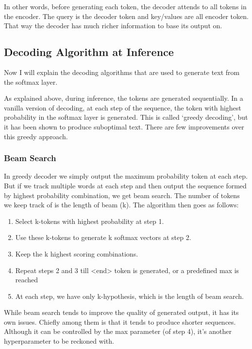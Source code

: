\documentclass[]{krantz}
\providecommand{\tightlist}{%
  \setlength{\itemsep}{0pt}\setlength{\parskip}{0pt}}
\begin{document}
In other words, before generating each token, the decoder attends to all tokens in the encoder. The query is the decoder token and key/values are all encoder token. That way the decoder has much richer information to base its output on.

\hypertarget{decoding-algorithm-at-inference}{%
\subsection{Decoding Algorithm at Inference}\label{decoding-algorithm-at-inference}}

Now I will explain the decoding algorithms that are used to generate text from the softmax layer.

As explained above, during inference, the tokens are generated sequentially. In a vanilla version of decoding, at each step of the sequence, the token with highest probability in the softmax layer is generated. This is called `greedy decoding', but it has been shown to produce suboptimal text. There are few improvements over this greedy approach.

\hypertarget{beam-search}{%
\subsubsection{Beam Search}\label{beam-search}}

In greedy decoder we simply output the maximum probability token at each step. But if we track multiple words at each step and then output the sequence formed by highest probability combination, we get beam search. The number of tokens we keep track of is the length of beam (k). The algorithm then goes as follows:

\begin{enumerate}
\def\labelenumi{\arabic{enumi}.}
\tightlist
\item
  Select k-tokens with highest probability at step 1.
\item
  Use these k-tokens to generate k softmax vectors at step 2.
\item
  Keep the k highest scoring combinations.
\item
  Repeat steps 2 and 3 till \textless{}end\textgreater{} token is generated, or a predefined max is reached
\item
  At each step, we have only k-hypothesis, which is the length of beam search.
\end{enumerate}

While beam search tends to improve the quality of generated output, it has its own issues. Chiefly among them is that it tends to produce shorter sequences. Although it can be controlled by the max parameter (of step 4), it's another hyperparameter to be reckoned with.
\end{document}

